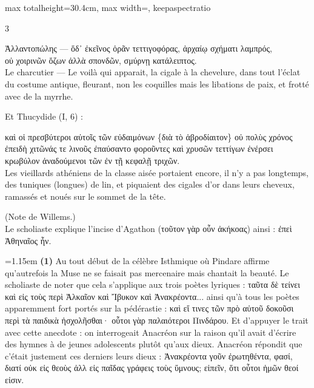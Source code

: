 \documentclass[11pt,twoside]{book}
\newcommand{\citComm}[1]{\begin{quoting}[vskip=0.4pt,leftmargin=0.7em,rightmargin=0.2em]#1\end{quoting}}
\newcommand{\francais}[1]{{\policeFr #1}}
\begin{document}
\begin{adjustbox}{max totalheight=30.4cm, max width=\textwidth, keepaspectratio}
\begin{minipage}{\textwidth}
{\begin{multicols}{3}
\citComm{Ἀλλαντοπώλης — ὅδ᾽ ἐκεῖνος ὁρᾶν τεττιγοφόρας, ἀρχαίῳ σχήματι λαμπρός,\\
οὐ χοιρινῶν ὄζων ἀλλὰ σπονδῶν, σμύρνῃ κατάλειπτος.\\
\francais{Le charcutier — Le voilà qui apparait, la cigale à la chevelure, dans tout l'éclat du costume antique, fleurant, non les coquilles mais les libations de paix, et frotté avec de la myrrhe.}}
\par\vspace{1.5pt}
\noindent Et Thucydide (I, 6) :
\citComm{καὶ οἱ πρεσβύτεροι αὐτοῖς τῶν εὐδαιμόνων \{διὰ τὸ ἁβροδίαιτον\} οὐ πολὺς χρόνος ἐπειδὴ χιτῶνάς τε λινοῦς ἐπαύσαντο φοροῦντες καὶ χρυσῶν τεττίγων ἐνέρσει κρωβύλον ἀναδούμενοι τῶν ἐν τῇ κεφαλῇ τριχῶν.\\
Les vieillards athéniens de la classe aisée portaient encore, il n'y a pas longtemps, des tuniques (longues) de lin, et piquaient des cigales d'or dans leurs cheveux, ramassés et noués sur le sommet de la tête.}
\par\vspace{1.5pt}
\noindent (Note de Willems.)\\ Le scholiaste explique l'incise d'Agathon (τοῦτον γὰρ οὖν ἀκήκοας) ainsi : ἐπεὶ Ἀθηναῖος ἦν.
\par\vspace{1.5pt}
\par\vspace{1.2pt}\par\nopagebreak\vspace{1pt}\noindent\hangindent=1.15em {\color{sepiaNote}\textbf{(1)}} Au tout début de la célèbre Isthmique où Pindare affirme qu'autrefois la Muse ne se faisait pas mercenaire mais chantait la beauté. Le scholiaste de noter que cela s'applique aux trois poètes lyriques : ταῦτα δὲ τείνει καὶ εἰς τοὺς περὶ Ἀλκαῖον καὶ Ἴβυκον καὶ Ἀνακρέοντα... ainsi qu'à tous les poètes apparemment fort portés sur la pédérastie : καὶ εἴ τινες τῶν πρὸ αὐτοῦ δοκοῦσι περὶ τὰ παιδικὰ ἠσχολῆσθαι· οὗτοι γὰρ παλαιότεροι Πινδάρου. Et d'appuyer le trait avec cette anecdote : on interrogeait Anacréon sur la raison qu'il avait d'écrire des hymnes à de jeunes adolescents plutôt qu'aux dieux. Anacréon répondit que c'était justement ces derniers leurs dieux : Ἀνακρέοντα γοῦν ἐρωτηθέντα, φασί, διατί οὐκ εἰς θεοὺς ἀλλ εἰς παῖδας γράφεις τοὺς ὕμνους; εἰπεῖν, ὅτι οὗτοι ἡμῶν θεοί εἰσιν.
\par\vspace{1.5pt}

\end{multicols}}
\end{minipage}
\end{adjustbox}
\end{document}
